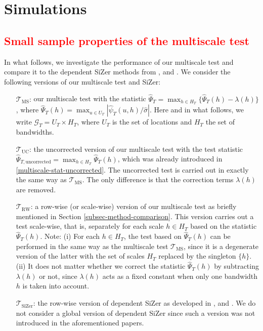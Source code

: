 
\section{Simulations}\label{sec-sim}


\subsection{\textcolor{red}{Small sample properties of the multiscale test}}\label{subsec-sim-multiscale}


In what follows, we investigate the performance of our multiscale test and compare it to the dependent SiZer methods from \cite{Rondonotti2004}, \cite{Rondonotti2007} and \cite{ParkHannigKang2009}. We consider the following versions of our multiscale test and SiZer:
\begin{itemize}[leftmargin=1.25cm]

\item[$\mathcal{T}_{\text{MS}}$:] our multiscale test with the statistic $\widehat{\Psi}_T = \max_{h \in H_T} \{ \widehat{\Psi}_T(h) - \lambda(h) \}$, where $\widehat{\Psi}_T(h) = \max_{u \in U_T} |\widehat{\psi}_T(u,h) / \widehat{\sigma}|$. Here and in what follows, we write $\mathcal{G}_T = U_T \times H_T$, where $U_T$ is the set of locations and $H_T$ the set of bandwidths.  

\item[$\mathcal{T}_{\text{UC}}$:] the uncorrected version of our multiscale test with the test statistic $\widehat{\Psi}_{T,\text{uncorrected}} = \max_{h \in H_T} \widehat{\Psi}_T(h)$, which was already introduced in \eqref{multiscale-stat-uncorrected}. The uncorrected test is carried out in exactly the same way as $\mathcal{T}_{\text{MS}}$. The only difference is that the correction terms $\lambda(h)$ are removed. 

\item[$\mathcal{T}_{\text{RW}}$:] a row-wise (or scale-wise) version of our multiscale test as briefly mentioned in Section \ref{subsec-method-comparison}. This version carries out a test scale-wise, that is, separately for each scale $h \in H_T$ based on the statistic $\widehat{\Psi}_T(h)$. Note: (i) For each $h \in H_T$, the test based on $\widehat{\Psi}_T(h)$ can be performed in the same way as the multiscale test $\mathcal{T}_{\text{MS}}$, since it is a degenerate version of the latter with the set of scales $H_T$ replaced by the singleton $\{h\}$. (ii) It does not matter whether we correct the statistic $\widehat{\Psi}_T(h)$ by subtracting $\lambda(h)$ or not, since $\lambda(h)$ acts as a fixed constant when only one bandwidth $h$ is taken into account. 

\item[$\mathcal{T}_{\text{SiZer}}$:] the row-wise version of dependent SiZer as developed in \cite{Rondonotti2004}, \cite{Rondonotti2007} and \cite{ParkHannigKang2009}. We do not consider a global version of dependent SiZer since such a version was not introduced in the aforementioned papers. 

\end{itemize}



